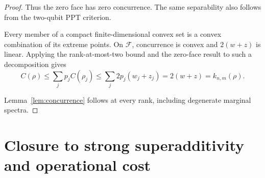 \documentclass[10pt,letterpaper]{article}
\begin{document}
\begin{proof}
Thus the zero face has zero concurrence. The same separability also follows from the two-qubit PPT criterion.

Every member of a compact finite-dimensional convex set is a convex combination of its extreme points. On \(\mathcal F\), concurrence is convex and \(2(w+z)\) is linear. Applying the rank-at-most-two bound and the zero-face result to such a decomposition gives
\begin{equation*}
C(\rho)\le\sum_jp_jC(\rho_j)\le\sum_j2p_j(w_j+z_j)=2(w+z)=k_{n,m}(\rho).
\end{equation*}

Lemma~\ref{lem:concurrence} follows at every rank, including degenerate marginal spectra. \end{proof}

\section{Closure to strong superadditivity and operational cost}
\end{document}
